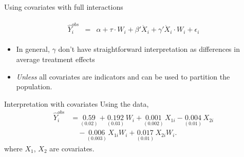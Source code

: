 \documentclass[xcolor={dvipsnames},handout]{beamer}
\begin{document}
\begin{frame}{Using covariates with full interactions}

\begin{gather}
\begin{aligned}
\hat Y_{i}^{obs} & = &\alpha + \tau \cdot W_i + \beta ' \dot X_i + \gamma ' \dot X_i \cdot W_i+  \epsilon_i
\nonumber
\end{aligned}
\end{gather}

\begin{itemize}
\item In general, $\gamma$ don't have straightforward interpretation as differences in average treatment effects 
\item \textit{Unless} all covariates are indicators and can be used to partition the population.  
\end{itemize}

\end{frame}



\begin{frame}{Interpretation with covariates}
Using the \cite{duflo2012incentives} data,
\begin{align*}
\hat Y_i^{obs}
  &= \underset{(0.02)}{0.59}
   + \underset{(0.03)}{0.192}\, W_i
   + \underset{(0.002)}{0.001}\, X_{1i}
   - \underset{(0.01)}{0.004}\, X_{2i} \\
  &\quad - \underset{(0.003)}{0.006}\, X_{1i}W_i
   + \underset{(0.01)}{0.017}\, X_{2i}W_i .
\end{align*}
where $X_1$, $X_2$ are covariates.
\end{frame}


\end{document}
